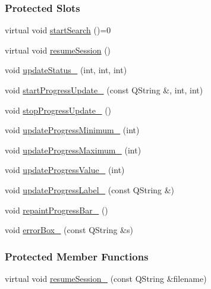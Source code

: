 \subsubsection*{Protected Slots}
\begin{DoxyCompactItemize}
\item 
virtual void \hyperlink{classGlobalSearch_1_1AbstractDialog_a40b7d250a73097f76edb2d77fce5482e}{start\+Search} ()=0
\item 
virtual void \hyperlink{classGlobalSearch_1_1AbstractDialog_a503a264e1a67559ace47d15d2c3aa61b}{resume\+Session} ()
\item 
void \hyperlink{classGlobalSearch_1_1AbstractDialog_ae5276198173f5a0da4a64adedc46f676}{update\+Status\+\_\+} (int, int, int)
\item 
void \hyperlink{classGlobalSearch_1_1AbstractDialog_a5370d90758c991200a233a78a1a51d16}{start\+Progress\+Update\+\_\+} (const Q\+String \&, int, int)
\item 
void \hyperlink{classGlobalSearch_1_1AbstractDialog_a5dd0aa68a9c1445965b9900290d4a507}{stop\+Progress\+Update\+\_\+} ()
\item 
void \hyperlink{classGlobalSearch_1_1AbstractDialog_a9013ffdb7bcec2ce4e6fec13fb0f1c0a}{update\+Progress\+Minimum\+\_\+} (int)
\item 
void \hyperlink{classGlobalSearch_1_1AbstractDialog_aa346e6c775c7edc9e423134ef8842c7b}{update\+Progress\+Maximum\+\_\+} (int)
\item 
void \hyperlink{classGlobalSearch_1_1AbstractDialog_af4c90078d59537ef9b9f7d69cbdc09c2}{update\+Progress\+Value\+\_\+} (int)
\item 
void \hyperlink{classGlobalSearch_1_1AbstractDialog_aff9811ebc7606ac13ae33b6130697fa9}{update\+Progress\+Label\+\_\+} (const Q\+String \&)
\item 
void \hyperlink{classGlobalSearch_1_1AbstractDialog_a455ad76e725fe59cd6f260d2c90d7a6d}{repaint\+Progress\+Bar\+\_\+} ()
\item 
void \hyperlink{classGlobalSearch_1_1AbstractDialog_a4ccf7b6a73663c780f82c2c6f4a39536}{error\+Box\+\_\+} (const Q\+String \&s)
\end{DoxyCompactItemize}
\subsubsection*{Protected Member Functions}
\begin{DoxyCompactItemize}
\item 
virtual void \hyperlink{classGlobalSearch_1_1AbstractDialog_a4ef7df380968131422757b20889d37b0}{resume\+Session\+\_\+} (const Q\+String \&filename)
\end{DoxyCompactItemize}

